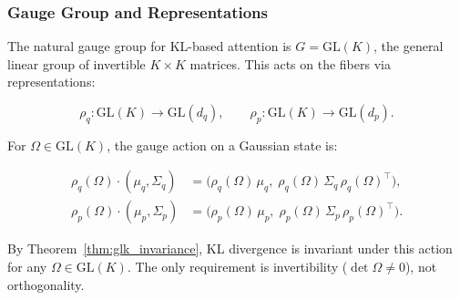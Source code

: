 \documentclass[twoside,11pt]{article}
\begin{document}
\subsubsection{Gauge Group and Representations}
The natural gauge group for KL-based attention is $G = \mathrm{GL}(K)$, the general linear group of invertible $K \times K$ matrices. This acts on the fibers via representations:

\begin{equation}
\rho_q: \mathrm{GL}(K) \to \mathrm{GL}(d_q),
\qquad
\rho_p: \mathrm{GL}(K) \to \mathrm{GL}(d_p).
\label{eq:representations}
\end{equation}

For $\Omega \in \mathrm{GL}(K)$, the gauge action on a Gaussian state is:

\begin{equation}
\boxed{
\begin{aligned}
\rho_q(\Omega) \cdot (\mu_q, \Sigma_q)
&= \big(\rho_q(\Omega)\,\mu_q,\;
\rho_q(\Omega)\,\Sigma_q\,\rho_q(\Omega)^\top\big),\\
\rho_p(\Omega) \cdot (\mu_p, \Sigma_p)
&= \big(\rho_p(\Omega)\,\mu_p,\;
\rho_p(\Omega)\,\Sigma_p\,\rho_p(\Omega)^\top\big).
\end{aligned}
}
\label{eq:gauge_action_gaussians}
\end{equation}

By Theorem~\ref{thm:glk_invariance}, KL divergence is invariant under this action for any $\Omega \in \mathrm{GL}(K)$. The only requirement is invertibility ($\det \Omega \neq 0$), not orthogonality.
\end{document}
